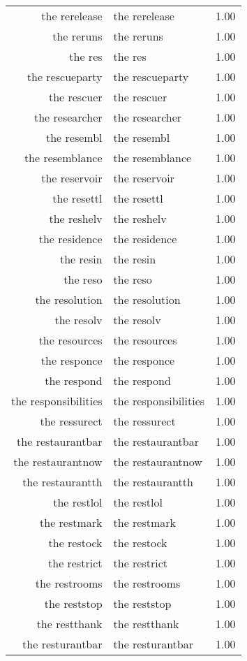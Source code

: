 \begin{table}[ht]
\begin{tabular}{rlr}
  the rerelease & the rerelease & 1.00 \\ 
  the reruns & the reruns & 1.00 \\ 
  the res & the res & 1.00 \\ 
  the rescueparty & the rescueparty & 1.00 \\ 
  the rescuer & the rescuer & 1.00 \\ 
  the researcher & the researcher & 1.00 \\ 
  the resembl & the resembl & 1.00 \\ 
  the resemblance & the resemblance & 1.00 \\ 
  the reservoir & the reservoir & 1.00 \\ 
  the resettl & the resettl & 1.00 \\ 
  the reshelv & the reshelv & 1.00 \\ 
  the residence & the residence & 1.00 \\ 
  the resin & the resin & 1.00 \\ 
  the reso & the reso & 1.00 \\ 
  the resolution & the resolution & 1.00 \\ 
  the resolv & the resolv & 1.00 \\ 
  the resources & the resources & 1.00 \\ 
  the responce & the responce & 1.00 \\ 
  the respond & the respond & 1.00 \\ 
  the responsibilities & the responsibilities & 1.00 \\ 
  the ressurect & the ressurect & 1.00 \\ 
  the restaurantbar & the restaurantbar & 1.00 \\ 
  the restaurantnow & the restaurantnow & 1.00 \\ 
  the restaurantth & the restaurantth & 1.00 \\ 
  the restlol & the restlol & 1.00 \\ 
  the restmark & the restmark & 1.00 \\ 
  the restock & the restock & 1.00 \\ 
  the restrict & the restrict & 1.00 \\ 
  the restrooms & the restrooms & 1.00 \\ 
  the reststop & the reststop & 1.00 \\ 
  the restthank & the restthank & 1.00 \\ 
  the resturantbar & the resturantbar & 1.00 \\ 

\end{tabular}
\end{table}
